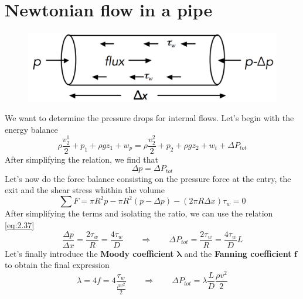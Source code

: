 \section{Newtonian flow in a pipe}
	\begin{figure}
	\vspace{-5mm}
	\includegraphics[scale=0.2]{ch2/5}
	\end{figure}
	We want to determine the pressure drops for internal flows. Let's begin with the energy balance 
	\begin{equation}
			\rho \frac{v_2^1}{2} + p_1 + \rho gz_1 + w_p = \rho \frac{v_2^2}{2} + p_2 + \rho gz_2+w_t + \Delta P_{tot}
	\end{equation}
	After simplifying the relation, we find that 
	\begin{equation}
		\Delta p = \Delta P_{tot} 
		\label{eq:2.37}
	\end{equation}
	Let's now do the force balance consisting on the pressure force at the entry, the exit and the shear stress whithin the volume
	\begin{equation}
		\sum F = \pi R^2 p - \pi R^2 (p-\Delta p) - (2\pi R \Delta x)\tau _{w} = 0 
	\end{equation}
	After simplifying the terms and isolating the ratio, we can use the relation \autoref{eq:2.37}
	\begin{equation}
		\frac{\Delta p}{\Delta x} = \frac{2\tau _w}{R} = \frac{4 \tau _w}{D} \qquad \Rightarrow \qquad \Delta P_{tot} = \frac{2\tau _w}{R} = \frac{4 \tau _w}{D} L
	\end{equation}
	Let's finally introduce the \textbf{Moody coefficient} $\mathbf{\lambda}$ and the \textbf{Fanning coefficient} $\mathbf{f}$ to obtain the final expression 
	\begin{equation}
		\lambda = 4f = 4\frac{\tau _w}{\frac{\rho v^2}{2}} \qquad \Rightarrow  \qquad \Delta P_{tot} = \lambda\frac{L}{D}\frac{\rho v^2}{2}
	\end{equation}

	